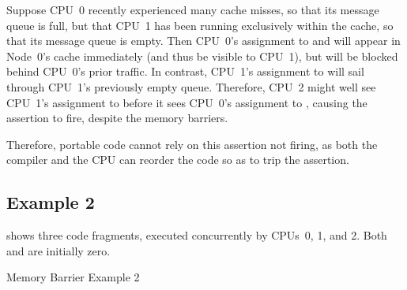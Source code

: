 Suppose CPU~0 recently experienced many cache misses, so that its
message queue is full, but that CPU~1 has been running exclusively within
the cache, so that its message queue is empty.
Then CPU~0's assignment to  and  will appear in Node~0's cache
immediately (and thus be visible to CPU~1), but will be blocked behind
CPU~0's prior traffic.
In contrast, CPU~1's assignment to  will sail through CPU~1's
previously empty queue.
Therefore, CPU~2 might well see CPU~1's assignment to  before
it sees CPU~0's assignment to , causing the assertion to fire,
despite the memory barriers.

Therefore, portable code cannot rely on this assertion not firing,
as both the compiler and the CPU can reorder the code so as to trip
the assertion.

\QuickQuizEnd

\subsection{Example 2}
\label{sec:app:whymb:Example 2}

shows three code fragments, executed concurrently by CPUs~0, 1, and 2.
Both  and  are initially zero.

\begin{listing}
\scriptsize
{}
\caption{Memory Barrier Example 2}
\label{lst:app:whymb:Memory Barrier Example 2}
\end{listing}

